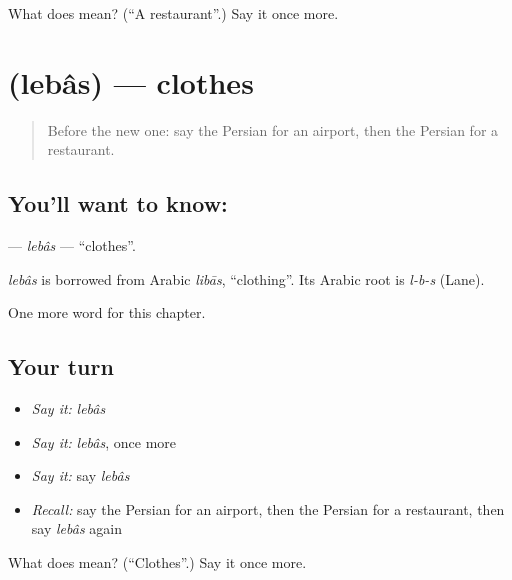 \begin{tcolorbox}[breakable,colback=teal!4,colframe=teal!35!black,title={Before you move on}]
What does  mean? (\textquotedblleft{}A restaurant\textquotedblright{}.) Say it once more.
\end{tcolorbox}
\section[\texorpdfstring{\fa{لباس} (lebâs)}{لباس (lebâs)}]{ (lebâs) — clothes}

\label{lesson:FA-C73-lebas}



\begin{quote}
Before the new one: say the Persian for an airport, then the Persian for a restaurant.
\end{quote}

\subsection*{You'll want to know: }
\textbf{} — \emph{lebâs} — \textquotedblleft{}clothes\textquotedblright{}.

\begin{cousinweb}
\emph{lebâs} is borrowed from Arabic \emph{libās}, \textquotedblleft{}clothing\textquotedblright{}. Its Arabic root is \emph{l-b-s} (Lane).
\end{cousinweb}

\begin{grammarlens}[title={What you've built}]
One more word for this chapter.
\end{grammarlens}

\subsection*{Your turn}
\begin{itemize}
\raggedright
  \item \emph{Say it:} \emph{lebâs}
  \item \emph{Say it:} \emph{lebâs}, once more
  \item \emph{Say it:} say \emph{lebâs}
  \item \emph{Recall:} say the Persian for an airport, then the Persian for a restaurant, then say \emph{lebâs} again
\end{itemize}

\begin{tcolorbox}[breakable,colback=teal!4,colframe=teal!35!black,title={Before you move on}]
What does  mean? (\textquotedblleft{}Clothes\textquotedblright{}.) Say it once more.
\end{tcolorbox}
